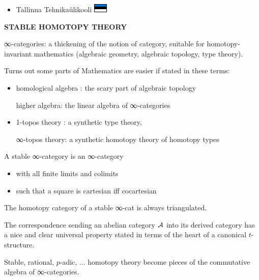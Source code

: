 \documentclass{beamer}
\begin{document}
\begin{frame}
\begin{itemize}
    \item<+-> Tallinna Tehnikaülikooli \includegraphics{est.pdf}

  \end{itemize}
\end{frame}
%
%
%
%
%
\begin{frame}
  \Huge\centering \bfseries STABLE HOMOTOPY THEORY
\end{frame}
%
\begin{frame}
  \alert{∞-categories}: a thickening of the notion of category, suitable for homotopy-invariant mathematics (algebraic geometry, algebraic topology, type theory).

  \onslide<+->
  Turns out some parts of Mathematics are easier if stated in these terms:
  \begin{itemize}
    \item homological algebra : the scary part of algebraic topology

    {\footnotesize higher algebra: the linear algebra of ∞-categories}
    \item 1-topos theory : a synthetic type theory,

    {\footnotesize ∞-topos theory: a synthetic homotopy theory of homotopy types}
  \end{itemize}
\end{frame}
%
%
%
%
%
\begin{frame}
  A \alert{stable ∞-category} is an ∞-category
\begin{itemize}
\item with all \alert{finite limits and colimits}
\item such that a square is \alert{cartesian iff cocartesian}
\end{itemize}
\onslide<+->
The homotopy category of a stable ∞-cat is always triangulated.

\onslide<+->
The correspondence sending an abelian category $\cal A$ into its derived category has a nice and clear \alert{universal property} stated in terms of the heart of a canonical $t$-structure.

\onslide<+->
Stable, rational, $p$-adic, ...  homotopy theory become pieces of the commutative algebra of  ∞-categories.
\end{frame}
\end{document}
